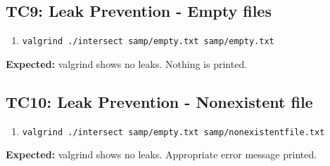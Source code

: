 \documentclass[11pt]{report}
\begin{document}
\subsection*{TC9: Leak Prevention - Empty files}
\begin{enumerate}
  \item {\texttt{\color{red}valgrind ./intersect samp/empty.txt samp/empty.txt}}
\end{enumerate}
\textbf{Expected:} valgrind shows no leaks. Nothing is printed.
\subsection*{TC10: Leak Prevention - Nonexistent file}
\begin{enumerate}
  \item {\texttt{\color{red}valgrind ./intersect samp/empty.txt samp/nonexistentfile.txt}}
\end{enumerate}
\textbf{Expected:} valgrind shows no leaks. Appropriate error message printed.
\end{document}
